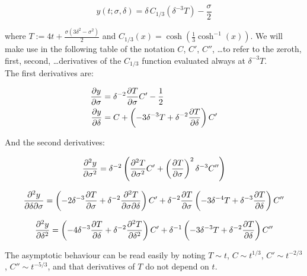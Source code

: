 \begin{equation}
	y(t;\sigma,\delta) = \delta \, C_{1/3} \left( \delta^{-3} T \right) - \frac{\sigma}{2}
	\label{}
\end{equation}

where $T := 4t + \frac{\sigma(3\delta^2-\sigma^2)}{2}$ and $C_{1/3}(x) = \cosh\left( \frac{1}{3} \cosh^{-1}(x) \right)$. We will make use in the following table of the notation $C$, $C'$, $C''$, \dots to refer to the zeroth, first, second, \dots derivatives of the $C_{1/3}$ function evaluated always at $\delta^{-3} T$.\\

The first derivatives are:

\begin{align}
	\frac{\partial y}{\partial\sigma} & = \delta^{-2} \frac{\partial T}{\partial\sigma} C' - \frac{1}{2}\\
	\frac{\partial y}{\partial\delta} & = C + \left(-3 \delta^{-3} T + \delta^{-2} \frac{\partial T}{\partial\delta}\right) C'
\end{align}

And the second derivatives:

\begin{equation}
	\frac{\partial^2 y}{\partial \sigma^2} = \delta^{-2} \left( \frac{\partial^2 T}{\partial \sigma^2} C' + \left( \frac{\partial T}{\partial\sigma} \right)^2 \delta^{-3} C'' \right)
	\label{}
\end{equation}

\begin{equation}
	\frac{\partial^2 y}{\partial \delta \partial \sigma} = \left(-2\delta^{-3} \frac{\partial T}{\partial\sigma}  + \delta^{-2} \frac{\partial^2 T}{\partial \sigma \partial \delta} \right) C' + \delta^{-2} \frac{\partial T}{\partial\sigma} \left( -3\delta^{-4} T + \delta^{-3} \frac{\partial T}{\partial\delta} \right)C''
	\label{}
\end{equation}


\begin{equation}
	\frac{\partial^2 y}{\partial \delta^2} = 
	\left( -4\delta^{-3} \frac{\partial T}{\partial\delta}  + \delta^{-2}\frac{\partial^2 T}{\partial \delta^2}\right)C'  + \delta^{-1} \left( -3\delta^{-3} T + \delta^{-2} \frac{\partial T}{\partial\delta} \right)C''
	\label{}
\end{equation}

The asymptotic behaviour can be read easily by noting $T \sim t$, $C \sim t^{1/3}$, $C' \sim t^{-2/3}$, $C'' \sim t^{-5/3}$, and that derivatives of $T$ do not depend on $t$.

